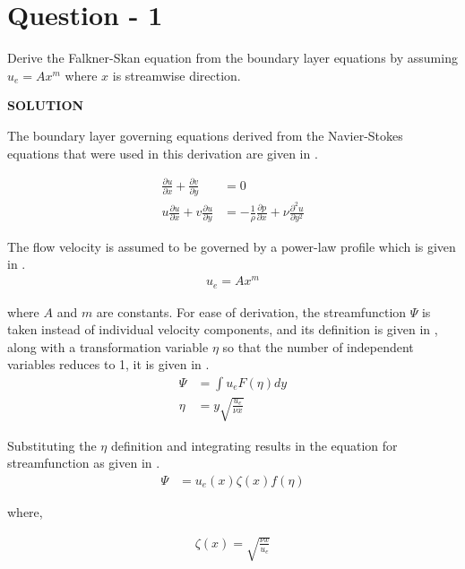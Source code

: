 \section{Question - 1}
Derive the Falkner-Skan equation from the boundary layer equations by assuming
$u_e = Ax^m$ where $x$ is streamwise direction.

\vspace{0.5cm}
\textbf{SOLUTION}
\vspace{0.5cm}

\par The boundary layer governing equations derived from the Navier-Stokes
equations that were used in this derivation are given in .

\begin{align}
    \frac{\partial u}{\partial x} + \frac{\partial v}{\partial y} &= 0 \label{bl_eqn1} \\
    u\frac{\partial u}{\partial x} + v\frac{\partial u}{\partial y} &= -\frac{1}{\rho}\frac{\partial p}{\partial x} + \nu \frac{\partial^2 u}{\partial y^2} \label{bl_eqn2}
\end{align}

\par The flow velocity is assumed to be governed by a power-law profile
which is given in .
\begin{align}
    u_e = A x^m \label{power_law_eqn}
\end{align}

where $A$ and $m$ are constants. For ease of derivation, the streamfunction $\Psi$
is taken instead of individual velocity components, and its definition is given in
, along with a transformation variable $\eta$ so that the
number of independent variables reduces to 1, it is given in .
\begin{align}
    \Psi &= \int{}{} u_e F(\eta) dy \label{shi_definition} \\
    \eta &= y \sqrt{\frac{u_e}{\nu x}} \label{eta_definition}
\end{align}

Substituting the $\eta$ definition and integrating results in the equation for
streamfunction as given in .
\begin{align}
    \Psi &= u_e(x) \zeta(x)  f(\eta) \label{shi_equation}
\end{align}

where,

\begin{align}
    \zeta(x) = \sqrt{\frac{\nu x}{u_e}} \label{zeta_definition}
\end{align}

